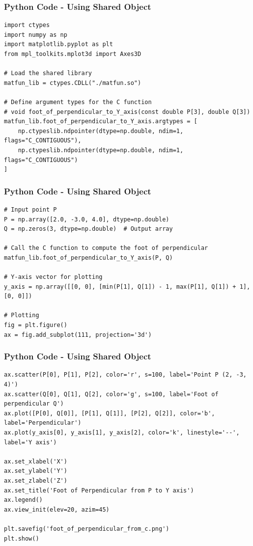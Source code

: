 \documentclass{beamer}
\numberwithin{equation}{section}
\begin{document}
\begin{frame}[fragile]
    \frametitle{Python Code - Using Shared Object}
    \begin{lstlisting}
import ctypes
import numpy as np
import matplotlib.pyplot as plt
from mpl_toolkits.mplot3d import Axes3D

# Load the shared library
matfun_lib = ctypes.CDLL("./matfun.so")

# Define argument types for the C function
# void foot_of_perpendicular_to_Y_axis(const double P[3], double Q[3])
matfun_lib.foot_of_perpendicular_to_Y_axis.argtypes = [
    np.ctypeslib.ndpointer(dtype=np.double, ndim=1, flags="C_CONTIGUOUS"),
    np.ctypeslib.ndpointer(dtype=np.double, ndim=1, flags="C_CONTIGUOUS")
]

\end{lstlisting}
\end{frame}

\begin{frame}[fragile]
    \frametitle{Python Code - Using Shared Object}
    \begin{lstlisting}
# Input point P
P = np.array([2.0, -3.0, 4.0], dtype=np.double)
Q = np.zeros(3, dtype=np.double)  # Output array

# Call the C function to compute the foot of perpendicular
matfun_lib.foot_of_perpendicular_to_Y_axis(P, Q)

# Y-axis vector for plotting
y_axis = np.array([[0, 0], [min(P[1], Q[1]) - 1, max(P[1], Q[1]) + 1], [0, 0]])

# Plotting
fig = plt.figure()
ax = fig.add_subplot(111, projection='3d')

\end{lstlisting}
\end{frame}
\begin{frame}[fragile]
    \frametitle{Python Code - Using Shared Object}
    \begin{lstlisting}
ax.scatter(P[0], P[1], P[2], color='r', s=100, label='Point P (2, -3, 4)')
ax.scatter(Q[0], Q[1], Q[2], color='g', s=100, label='Foot of perpendicular Q')
ax.plot([P[0], Q[0]], [P[1], Q[1]], [P[2], Q[2]], color='b', label='Perpendicular')
ax.plot(y_axis[0], y_axis[1], y_axis[2], color='k', linestyle='--', label='Y axis')

ax.set_xlabel('X')
ax.set_ylabel('Y')
ax.set_zlabel('Z')
ax.set_title('Foot of Perpendicular from P to Y axis')
ax.legend()
ax.view_init(elev=20, azim=45)

plt.savefig('foot_of_perpendicular_from_c.png')
plt.show()


\end{lstlisting}
\end{frame}
\end{document}
